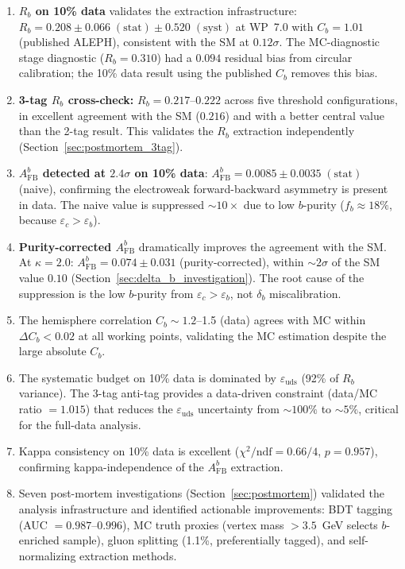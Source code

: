 \documentclass[11pt,a4paper]{article}
\begin{document}
\begin{enumerate}
\item \textbf{$R_b$ on 10\% data} validates the extraction infrastructure:
$R_b = 0.208 \pm 0.066\;\mathrm{(stat)} \pm 0.520\;\mathrm{(syst)}$ at WP~7.0
with $C_b = 1.01$ (published ALEPH), consistent with the SM at $0.12\sigma$.
The MC-diagnostic stage diagnostic ($R_b = 0.310$) had a $0.094$ residual bias from
circular calibration; the 10\% data result using the published $C_b$ removes
this bias.

\item \textbf{3-tag $R_b$ cross-check:} $R_b = 0.217$--$0.222$ across five threshold
configurations, in excellent agreement with the SM ($0.216$) and with a better
central value than the 2-tag result. This validates the $R_b$ extraction
independently (Section~\ref{sec:postmortem_3tag}).

\item \textbf{$A_\mathrm{FB}^b$ detected at $2.4\sigma$ on 10\% data}:
$A_\mathrm{FB}^b = 0.0085 \pm 0.0035\;\mathrm{(stat)}$ (naive), confirming the
electroweak forward-backward asymmetry is present in data. The naive value is
suppressed $\sim 10\times$ due to low $b$-purity ($f_b \approx 18\%$, because
$\varepsilon_c > \varepsilon_b$).

\item \textbf{Purity-corrected $A_\mathrm{FB}^b$} dramatically improves the agreement
with the SM. At $\kappa = 2.0$: $A_\mathrm{FB}^b = 0.074 \pm 0.031$ (purity-corrected),
within $\sim 2\sigma$ of the SM value $0.10$
(Section~\ref{sec:delta_b_investigation}). The root cause of the suppression is
the low $b$-purity from $\varepsilon_c > \varepsilon_b$, not $\delta_b$ miscalibration.

\item The hemisphere correlation $C_b \sim 1.2$--1.5 (data) agrees with MC within
$\Delta C_b < 0.02$ at all working points, validating the MC estimation despite
the large absolute $C_b$.

\item The systematic budget on 10\% data is dominated by $\varepsilon_\mathrm{uds}$
(92\% of $R_b$ variance). The 3-tag anti-tag provides a data-driven constraint
(data/MC ratio $= 1.015$) that reduces the $\varepsilon_\mathrm{uds}$ uncertainty
from $\sim 100\%$ to $\sim 5\%$, critical for the full-data analysis.

\item Kappa consistency on 10\% data is excellent ($\chi^2/\mathrm{ndf} = 0.66/4$,
$p = 0.957$), confirming kappa-independence of the $A_\mathrm{FB}^b$ extraction.

\item Seven post-mortem investigations (Section~\ref{sec:postmortem}) validated the
analysis infrastructure and identified actionable improvements: BDT tagging
(AUC $= 0.987$--$0.996$), MC truth proxies (vertex mass $> 3.5$~GeV selects
$b$-enriched sample), gluon splitting (1.1\%, preferentially tagged), and
self-normalizing extraction methods.
\end{enumerate}
\end{document}
